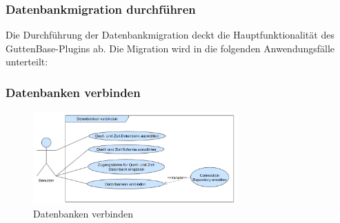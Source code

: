 \subsubsection{Datenbankmigration durchführen}
Die Durchführung der Datenbankmigration deckt die Hauptfunktionalität des GuttenBase-Plugins ab. Die Migration wird in die folgenden Anwendungsfälle unterteilt:
\subsubsection*{Datenbanken verbinden}
\begin{figure}[H]
	\centering
	\includegraphics[width=0.7\textwidth]{images/af/af-db-verbinden}
	\caption{Datenbanken verbinden}
	\label{img:af-db-verbinden}
\end{figure}

